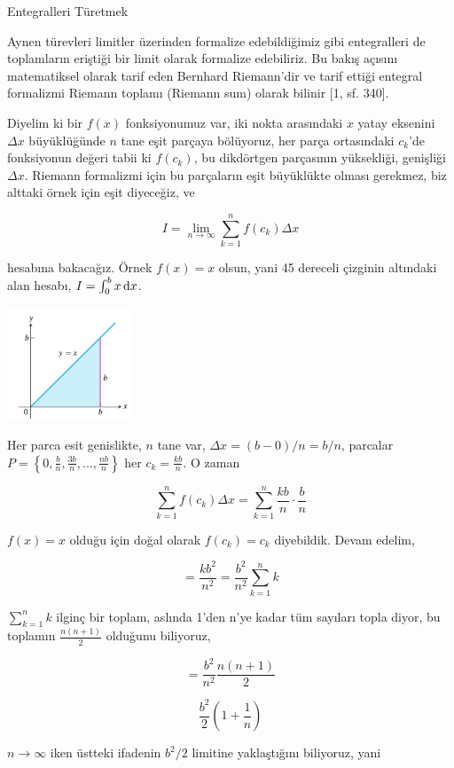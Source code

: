 \documentclass[12pt,fleqn]{article}\usepackage{../../common}
\begin{document}
Entegralleri Türetmek

Aynen türevleri limitler üzerinden formalize edebildiğimiz gibi
entegralleri de toplamların eriştiği bir limit olarak formalize
edebiliriz. Bu bakış açısını matematiksel olarak tarif eden Bernhard
Riemann'dir ve tarif ettiği entegral formalizmi Riemann toplamı (Riemann
sum) olarak bilinir [1, sf. 340]. 

Diyelim ki bir $f(x)$ fonksiyonumuz var, iki nokta arasındaki $x$ yatay
eksenini $\Delta x$ büyüklüğünde $n$ tane eşit parçaya bölüyoruz, her parça
ortasındaki $c_k$'de fonksiyonun değeri tabii ki $f(c_k)$, bu dikdörtgen
parçasının yüksekliği, genişliği $\Delta x$. Riemann formalizmi için bu
parçaların eşit büyüklükte olması gerekmez, biz alttaki örnek için eşit
diyeceğiz, ve

$$ 
I = \lim_{n \to \infty} \sum_{k=1}^{n} f(c_k) \Delta x
$$

hesabına bakacağız. Örnek $f(x) = x$ olsun, yani 45 dereceli çizginin
altındaki alan hesabı, $I = \int_{0}^{b} x \,\mathrm{d} x$.

\includegraphics[width=10em]{ode_mattuck_94_int_01.png}

Her parca esit genislikte, $n$ tane var, $\Delta x = (b - 0) / n = b/n$,
parcalar $P = \left\{ 0, \frac{b}{n}, \frac{3b}{n}, ..., \frac{nb}{n}
\right\}$ her $c_k = \frac{kb}{n}$. O zaman 

$$ 
\sum_{k=1}^{n} f(c_k) \Delta x = \sum_{k=1}^{n} \frac{kb}{n} \cdot \frac{b}{n}
$$

$f(x) = x$ olduğu için doğal olarak $f(c_k)=c_k$ diyebildik. Devam edelim, 

$$ 
= \frac{kb^2}{n^2} = \frac{b^2}{n^2} \sum_{k=1}^{n} k
$$

$\sum_{k=1}^{n} k$ ilginç bir toplam, aslında 1'den n'ye kadar tüm
sayıları topla diyor, bu toplamın $\frac{n(n+1)}{2}$ olduğunu biliyoruz, 

$$ 
= \frac{b^2}{n^2} \frac{n(n+1)}{2}
$$

$$ 
\frac{b^2}{2} (1 + \frac{1}{n})
$$

$n \to \infty$ iken üstteki ifadenin $b^2/2$ limitine yaklaştığını
biliyoruz, yani
\end{document}
